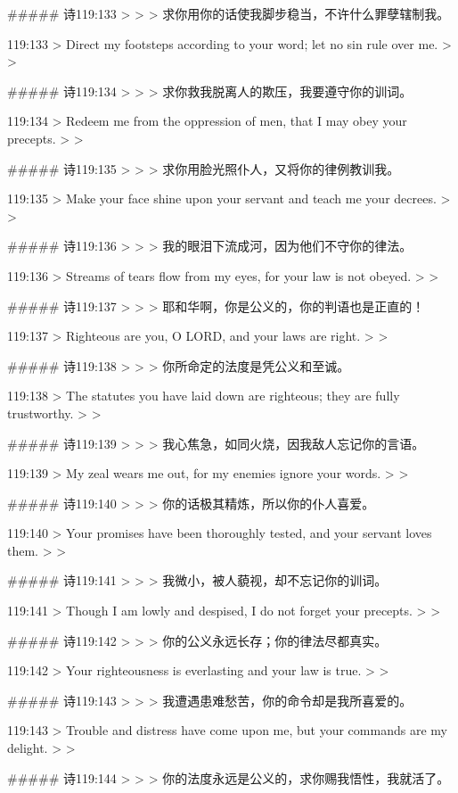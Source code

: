 ##### 诗119:133
> 
>
> 求你用你的话使我脚步稳当，不许什么罪孽辖制我。


119:133
> Direct my footsteps according to your word; let no sin rule over me.
>
> 


##### 诗119:134
> 
>
> 求你救我脱离人的欺压，我要遵守你的训词。


119:134
> Redeem me from the oppression of men, that I may obey your precepts.
>
> 


##### 诗119:135
> 
>
> 求你用脸光照仆人，又将你的律例教训我。


119:135
> Make your face shine upon your servant and teach me your decrees.
>
> 


##### 诗119:136
> 
>
> 我的眼泪下流成河，因为他们不守你的律法。


119:136
> Streams of tears flow from my eyes, for your law is not obeyed.
>
> 


##### 诗119:137
> 
>
> 耶和华啊，你是公义的，你的判语也是正直的！


119:137
> Righteous are you, O LORD, and your laws are right.
>
> 


##### 诗119:138
> 
>
> 你所命定的法度是凭公义和至诚。


119:138
> The statutes you have laid down are righteous; they are fully trustworthy.
>
> 


##### 诗119:139
> 
>
> 我心焦急，如同火烧，因我敌人忘记你的言语。


119:139
> My zeal wears me out, for my enemies ignore your words.
>
> 


##### 诗119:140
> 
>
> 你的话极其精炼，所以你的仆人喜爱。


119:140
> Your promises have been thoroughly tested, and your servant loves them.
>
> 


##### 诗119:141
> 
>
> 我微小，被人藐视，却不忘记你的训词。


119:141
> Though I am lowly and despised, I do not forget your precepts.
>
> 


##### 诗119:142
> 
>
> 你的公义永远长存；你的律法尽都真实。


119:142
> Your righteousness is everlasting and your law is true.
>
> 


##### 诗119:143
> 
>
> 我遭遇患难愁苦，你的命令却是我所喜爱的。


119:143
> Trouble and distress have come upon me, but your commands are my delight.
>
> 


##### 诗119:144
> 
>
> 你的法度永远是公义的，求你赐我悟性，我就活了。



